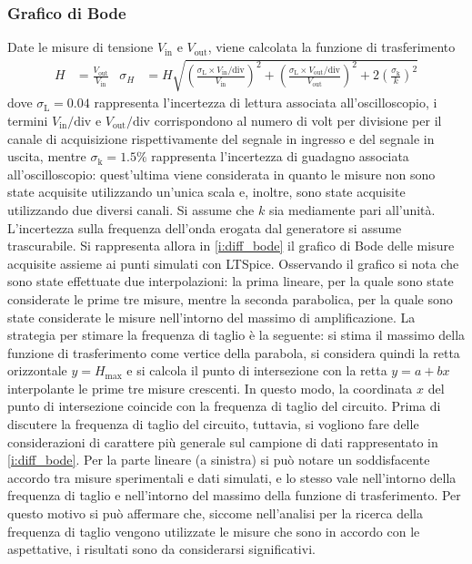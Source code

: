 \documentclass[a4paper,11pt]{article} %
\begin{document}

\subsubsection{Grafico di Bode}
Date le misure di tensione $V_{\text{in}}$ e $V_{\text{out}}$, viene calcolata la funzione di trasferimento
\begin{align}\label{e:diff_err}
	H&=\frac{V_{\text{out}}}{V_{\text{in}}} & \sigma_{H}&= H \sqrt{	
											\left(	\frac{	\sigma_{\text{L}}\times V_{\text{in}}/\text{div}	}{	V_{\text{in}}	}	\right)^2	 + 
											\left(	\frac{	\sigma_{\text{L}}\times V_{\text{out}}/\text{div}	}{	V_{\text{out}}	}	\right)^2 +	
											2\left(	\frac{	\sigma_{\text{k}}	}{	k	}	\right)^2 }	
\end{align}
\noindent dove $\sigma_{\text{L}}=0.04$ rappresenta l'incertezza di lettura associata all'oscilloscopio, i termini
$V_{\text{in}}/\text{div}$ e $V_{\text{out}}/\text{div}$ corrispondono al numero di volt per divisione per il canale di
acquisizione rispettivamente del segnale in ingresso e del segnale in uscita, mentre $\sigma_{\text{k}}=1.5\%$ rappresenta
l'incertezza di guadagno associata all'oscilloscopio: quest'ultima viene considerata in quanto le misure non sono state
acquisite utilizzando un'unica scala e, inoltre, sono state acquisite utilizzando due diversi canali. Si assume che $k$
sia mediamente pari all'unità. L'incertezza sulla frequenza dell'onda erogata dal generatore si assume trascurabile. Si
rappresenta allora in \autoref{i:diff_bode} il grafico di Bode delle misure acquisite assieme ai punti simulati con
LTSpice. Osservando il grafico si nota che sono state effettuate due interpolazioni: la prima lineare, per la quale sono
state considerate le prime tre misure, mentre la seconda parabolica, per la quale sono state considerate le misure
nell'intorno del massimo di amplificazione. La strategia per stimare la frequenza di taglio è la seguente: si stima il
massimo della funzione di trasferimento come vertice della parabola, si considera quindi la retta orizzontale
$y=H_{\text{max}}$ e si calcola il punto di intersezione con la retta $y=a+bx$ interpolante le prime tre misure
crescenti. In questo modo, la coordinata $x$ del punto di intersezione coincide con la frequenza di taglio del circuito.
Prima di discutere la frequenza di taglio del circuito, tuttavia, si vogliono fare delle considerazioni di carattere più
generale sul campione di dati rappresentato in \autoref{i:diff_bode}. Per la parte lineare (a sinistra) si può notare un
soddisfacente accordo tra misure sperimentali e dati simulati, e lo stesso vale nell'intorno della frequenza di taglio e
nell'intorno del massimo della funzione di trasferimento. Per questo motivo si può affermare che, siccome nell'analisi
per la ricerca della frequenza di taglio vengono utilizzate le misure che sono in accordo con le aspettative, i
risultati sono da considerarsi significativi.  
\end{document}
